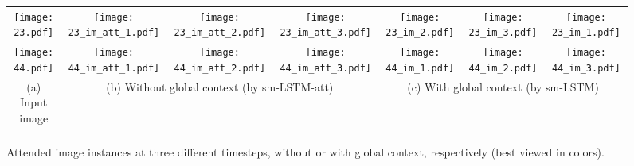 \documentclass[10pt,twocolumn,letterpaper]{article}
\begin{document}
\begin{figure*}[t]
\addtolength{\tabcolsep}{-2pt}
\centering
\begin{tabular}{ccccccc}






\texttt{[image: 23.pdf]}&
\texttt{[image: 23\_im\_att\_1.pdf]}\hspace{-3mm}&\hspace{-3mm}
\texttt{[image: 23\_im\_att\_2.pdf]}\hspace{-3mm}&\hspace{-3mm}
\texttt{[image: 23\_im\_att\_3.pdf]}&
\texttt{[image: 23\_im\_2.pdf]}\hspace{-3mm}&\hspace{-3mm}
\texttt{[image: 23\_im\_3.pdf]}\hspace{-3mm}&\hspace{-3mm}
\texttt{[image: 23\_im\_1.pdf]}\\


\texttt{[image: 44.pdf]}&
\texttt{[image: 44\_im\_att\_1.pdf]}\hspace{-3mm}&\hspace{-3mm}
\texttt{[image: 44\_im\_att\_2.pdf]}\hspace{-3mm}&\hspace{-3mm}
\texttt{[image: 44\_im\_att\_3.pdf]}&
\texttt{[image: 44\_im\_1.pdf]}\hspace{-3mm}&\hspace{-3mm}
\texttt{[image: 44\_im\_2.pdf]}\hspace{-3mm}&\hspace{-3mm}
\texttt{[image: 44\_im\_3.pdf]}\\




(a) Input image&  \multicolumn{3}{c}{(b) Without global context (by sm-LSTM-att)} &  \multicolumn{3}{c}{(c) With global context (by sm-LSTM)} \\
\\
\end{tabular}
\caption{Attended image instances at three different timesteps, without or with global context, respectively (best
viewed in colors).}
\label{figure:map2}
\end{figure*}
\end{document}
